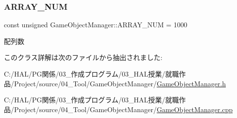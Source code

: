 \subsubsection{\texorpdfstring{A\+R\+R\+A\+Y\+\_\+\+N\+UM}{ARRAY\_NUM}}
{\footnotesize\ttfamily const unsigned Game\+Object\+Manager\+::\+A\+R\+R\+A\+Y\+\_\+\+N\+UM = 1000\hspace{0.3cm}{\ttfamily [static]}}



配列数 



このクラス詳解は次のファイルから抽出されました\+:\begin{DoxyCompactItemize}
\item 
C\+:/\+H\+A\+L/\+P\+G関係/03\+\_\+作成プログラム/03\+\_\+\+H\+A\+L授業/就職作品/\+Project/source/04\+\_\+\+Tool/\+Game\+Object\+Manager/\mbox{\hyperlink{_game_object_manager_8h}{Game\+Object\+Manager.\+h}}\item 
C\+:/\+H\+A\+L/\+P\+G関係/03\+\_\+作成プログラム/03\+\_\+\+H\+A\+L授業/就職作品/\+Project/source/04\+\_\+\+Tool/\+Game\+Object\+Manager/\mbox{\hyperlink{_game_object_manager_8cpp}{Game\+Object\+Manager.\+cpp}}\end{DoxyCompactItemize}
